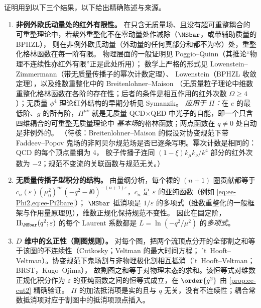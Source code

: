 证明用到以下三个结果，以下给出精确陈述与来源。
\begin{enumerate}[label=\textbf{(\Alph*)}]
\item \textbf{非例外欧氏动量处的红外有限性。}
在只含无质量场、且没有超可重整耦合的可重整理论中，若紫外重整化不在零动量处作减除（$\MSbar$，或带辅助质量的 BPHZL），
则在非例外欧氏动量（外动量的任何真部分和都不为零）处，重整化格林函数在每一阶有限。
物理层面的一般证明见 Poggio--Quinn\cite{PoggioQuinn1976}（其推论“物理不连续性亦红外有限”正是此处所用）；
数学上严格的形式见 Lowenstein--Zimmermann\cite{LowensteinZimmermann1975}（带无质量传播子的幂次计数定理）、
Lowenstein\cite{Lowenstein1976}（BPHZL 收敛定理），以及维数重整化中的 Breitenlohner--Maison\cite{BreitenlohnerMaison1977b,BreitenlohnerMaison1977c}
（无质量粒子理论中维数重整化格林函数在各阶的存在性；后者的条件是相互作用的红外次数 $\Omega\ge4$）；无质量 $\phi^4$ 理论红外结构的早期分析见 Symanzik\cite{Symanzik1973}。
\emph{应用于 $\Pi$：}在 $e$ 的最低阶、$g$ 的所有阶，$\Pi^{\mu\nu}$ 就是无质量 QCD$\times$QED 中光子的自能，即一个只含四维耦合的可重整无质量理论中
\emph{基本场}的格林函数；两点函数在 $q\ne0$ 处自动是非例外的。
（待核：Breitenlohner--Maison 的假设对协变规范下带 Faddeev--Popov 鬼场的非阿贝尔规范场是否已逐条写明。幂次计数是相同的：QCD 的每个顶点量纲为 4，
胶子传播子连同 $(1-\xi)k_\mu k_\nu/k^4$ 部分的红外次数为 $-2$；规范不变流的关联函数与规范无关。）
\item \textbf{无质量传播子型积分的结构。}
由量纲分析，每个裸的 $(n{+}1)$ 圈贡献都等于 $c_n(\varepsilon)(\mu_0^2)^{n\varepsilon}(-q^2-\ii0)^{-(n+1)\varepsilon}$，$c_n$ 是 $\varepsilon$ 的亚纯函数（例如 \cref{eq:ee-Phi2,eq:ee-Pi2bare}）；
$\MSbar$ 抵消项是 $1/\varepsilon$ 的多项式\cite{tHooft1973}（维数重整化的一般框架与作用量原理见\cite{BreitenlohnerMaison1977a}），维数正规化保持规范不变性\cite{tHooftVeltman1972}。
因此在固定阶，$\Pi_{\MSbar}(q^2;\varepsilon)$ 的每个 Laurent 系数都是 $L=\ln(-q^2/\mu^2)$ 的\emph{多项式}。
\item \textbf{$D$ 维中的幺正性（割图规则）。}
对每个图，把两个流顶点分开的全部割之和等于该图的不连续性（Cutkosky\cite{Cutkosky1960}；Veltman 的最大时间方程\cite{Veltman1963}；
't~Hooft--Veltman\cite{tHooftVeltman1974}）。协变规范下鬼场割与非物理极化割相互抵消（'t~Hooft--Veltman\cite{tHooftVeltman1972b}；BRST，Kugo--Ojima\cite{KugoOjima1979}），
故割图之和等于对物理末态的求和。该恒等式对维数正规化积分作为 $\varepsilon$ 的亚纯函数之间的恒等式成立，在 $\order{g^2}$ 由 \cref{prop:ee-cut2} 精确验证。
$\Pi$ 的加法抵消项是实的且与 $q$ 无关，没有不连续性；耦合常数抵消项对应于割图中的抵消项顶点插入。
\end{enumerate}

